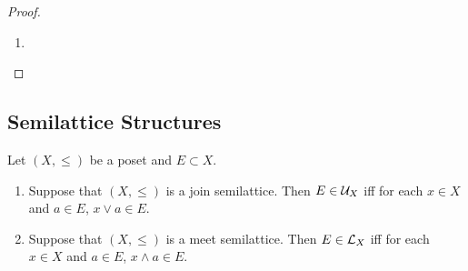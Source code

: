 \documentclass{book}
\begin{document}
\begin{proof}
\begin{enumerate}
\begin{itemize}
\begin{itemize}
				\end{itemize}
			\end{itemize}
			\item 
		\end{enumerate}
	\end{proof}
	
	
	
	
	
	
	
	
	
	
	
	
	
	
	
	
	
	
	
	
	
	
	
	
	
	
	
	
	
	
	
	
	
	
	
	
	
	
	
	
	
	
	
	
	
	
	
	
	
	
	
	\subsection{Semilattice Structures}
	
	\begin{defn}
		Let $(X, \leq)$ be a poset and $E \subset X$.
		\begin{enumerate}
			\item Suppose that $(X, \leq)$ is a join semilattice. Then $E \in \mathcal{U}_X$ iff for each $x \in X$ and $a \in E$, $x \vee a \in E$.
			\item Suppose that $(X, \leq)$ is a meet semilattice. Then $E \in \mathcal{L}_X$ iff for each $x \in X$ and $a \in E$, $x \wedge a \in E$.
		\end{enumerate}
	\end{defn}
	
\end{document}
